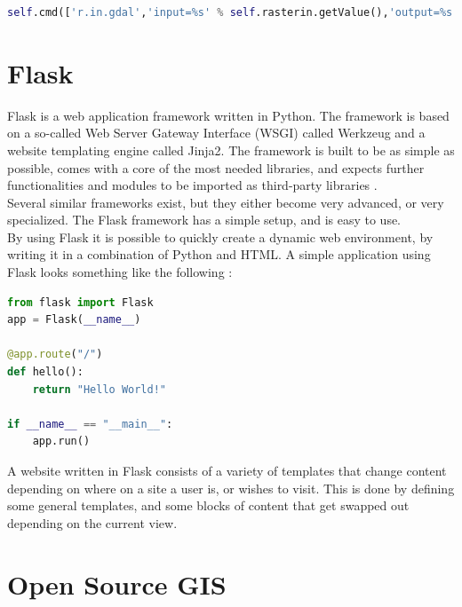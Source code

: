 \begin{lstlisting}[language=Python]
self.cmd(['r.in.gdal','input=%s' % self.rasterin.getValue(),'output=%s' % original,'-o'])
\end{lstlisting}

\section{Flask}

Flask is a web application framework written in Python. The framework is based on a so-called Web Server Gateway Interface (WSGI) called Werkzeug and a website templating engine called Jinja2. The framework is built to be as simple as possible, comes with a core of the most needed libraries, and expects further functionalities and modules to be imported as third-party libraries \citep{flaskbook}. \\
Several similar frameworks exist, but they either become very advanced, or very specialized. The Flask framework has a simple setup, and is easy to use. \citep{flaskbook} \\
By using Flask it is possible to quickly create a dynamic web environment, by writing it in a combination of Python and HTML. 
A simple application using Flask looks something like the following \citep{flaskweb}: 

\begin{lstlisting}[language=Python]
from flask import Flask
app = Flask(__name__)

@app.route("/")
def hello():
    return "Hello World!"

if __name__ == "__main__":
    app.run()
\end{lstlisting}

A website written in Flask consists of a variety of templates that change content depending on where on a site a user is, or wishes to visit. This is done by defining some general templates, and some blocks of content that get swapped out depending on the current view. 


\section{Open Source GIS}

